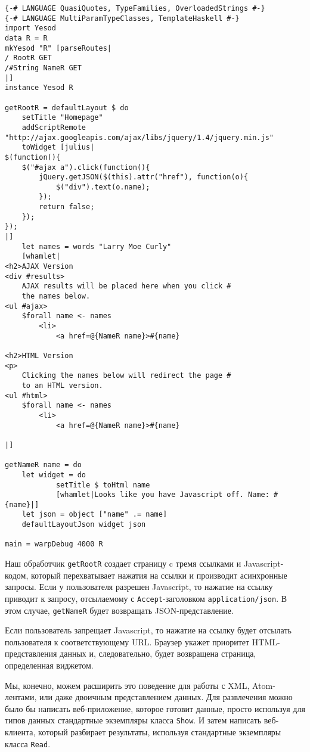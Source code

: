\begin{lstlisting}
{-# LANGUAGE QuasiQuotes, TypeFamilies, OverloadedStrings #-}
{-# LANGUAGE MultiParamTypeClasses, TemplateHaskell #-}
import Yesod
data R = R
mkYesod "R" [parseRoutes|
/ RootR GET
/#String NameR GET
|]
instance Yesod R

getRootR = defaultLayout $ do
    setTitle "Homepage"
    addScriptRemote "http://ajax.googleapis.com/ajax/libs/jquery/1.4/jquery.min.js"
    toWidget [julius|
$(function(){
    $("#ajax a").click(function(){
        jQuery.getJSON($(this).attr("href"), function(o){
            $("div").text(o.name);
        });
        return false;
    });
});
|]
    let names = words "Larry Moe Curly"
    [whamlet|
<h2>AJAX Version
<div #results>
    AJAX results will be placed here when you click #
    the names below.
<ul #ajax>
    $forall name <- names
        <li>
            <a href=@{NameR name}>#{name}

<h2>HTML Version
<p>
    Clicking the names below will redirect the page #
    to an HTML version.
<ul #html>
    $forall name <- names
        <li>
            <a href=@{NameR name}>#{name}

|]

getNameR name = do
    let widget = do
            setTitle $ toHtml name
            [whamlet|Looks like you have Javascript off. Name: #{name}|]
    let json = object ["name" .= name]
    defaultLayoutJson widget json

main = warpDebug 4000 R

\end{lstlisting}

Наш обработчик \lstinline'getRootR' создает страницу c тремя ссылками и Javascript-кодом,
который перехватывает нажатия на ссылки и производит асинхронные запросы. Если у
пользователя разрешен Javascript, то нажатие на ссылку приводит к запросу, отсылаемому с
\verb*|Accept|-заголовком \verb*|application/json|. В этом случае, \lstinline'getNameR'
будет возвращать JSON-представление.

Если пользователь запрещает Javascript, то нажатие на ссылку будет отсылать пользователя к соответствующему URL. Браузер укажет приоритет HTML-представления данных и, следовательно, будет возвращена страница, определенная виджетом.

Мы, конечно, можем расширить это поведение для работы с XML, Atom-лентами, или даже
двоичным представлением данных. Для развлечения можно было бы написать веб-приложение,
которое готовит данные, просто используя для типов данных стандартные экземпляры класса
\lstinline'Show'. И затем написать веб-клиента, который разбирает результаты, используя
стандартные экземпляры класса \lstinline'Read'.

